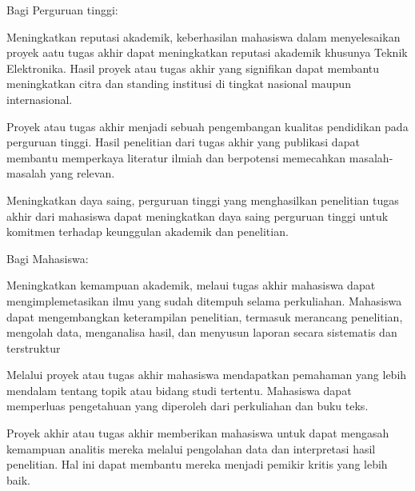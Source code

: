 \begin{packed_item}
	\item Bagi Perguruan tinggi:
	\begin{packed_enum}
		\item Meningkatkan reputasi akademik, keberhasilan mahasiswa dalam
		menyelesaikan proyek aatu tugas akhir dapat meningkatkan reputasi
		akademik khusunya Teknik Elektronika. Hasil proyek atau tugas akhir yang signifikan dapat membantu meningkatkan citra dan standing institusi di tingkat nasional maupun internasional.
		\item Proyek atau tugas akhir menjadi sebuah pengembangan kualitas pendidikan
		pada perguruan tinggi. Hasil penelitian dari tugas akhir yang publikasi dapat
		membantu memperkaya literatur ilmiah dan berpotensi memecahkan
		masalah-masalah yang relevan.
		\item Meningkatkan daya saing, perguruan tinggi yang menghasilkan penelitian
		tugas akhir dari mahasiswa dapat meningkatkan daya saing perguruan tinggi
		untuk komitmen terhadap keunggulan akademik dan penelitian.
	\end{packed_enum}
	\item Bagi Mahasiswa:
	\begin{packed_enum}
		\item Meningkatkan kemampuan akademik, melaui tugas akhir mahasiswa dapat
		mengimplemetasikan ilmu yang sudah ditempuh selama perkuliahan.
		Mahasiswa dapat mengembangkan keterampilan penelitian, termasuk
		merancang penelitian, mengolah data, menganalisa hasil, dan menyusun
		laporan secara sistematis dan terstruktur
		\item Melalui proyek atau tugas akhir mahasiswa mendapatkan pemahaman yang
		lebih mendalam tentang topik atau bidang studi tertentu. Mahasiswa dapat
		memperluas pengetahuan yang diperoleh dari perkuliahan dan buku teks.
		\item Proyek akhir atau tugas akhir memberikan mahasiswa untuk dapat mengasah
		kemampuan analitis mereka melalui pengolahan data dan interpretasi hasil penelitian. Hal ini dapat membantu mereka menjadi pemikir kritis yang lebih
		baik.
	\end{packed_enum}
\end{packed_item}

